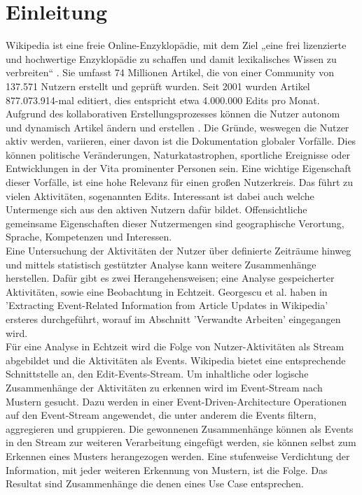 \section{Einleitung}\label{sec:Einleitung}
Wikipedia ist eine freie Online-Enzyklopädie, mit dem Ziel „eine frei lizenzierte und hochwertige Enzyklopädie zu schaffen und damit lexikalisches Wissen zu verbreiten“ \cite{wales.}. Sie umfasst 74 Millionen Artikel, die von einer Community von 137.571 Nutzern erstellt und geprüft wurden. Seit 2001 wurden Artikel 877.073.914-mal editiert, dies entspricht etwa 4.000.000 Edits pro Monat. \cite{wikistat}\\

Aufgrund des kollaborativen Erstellungsprozesses können die Nutzer autonom und dynamisch Artikel ändern und erstellen \cite{wikipedia.}.
Die Gründe, weswegen die Nutzer aktiv werden, variieren, einer davon ist die Dokumentation globaler Vorfälle. Dies können politische Veränderungen, Naturkatastrophen, sportliche Ereignisse oder Entwicklungen in der Vita prominenter Personen sein. Eine wichtige Eigenschaft dieser Vorfälle, ist eine hohe Relevanz für einen großen Nutzerkreis. Das führt zu vielen Aktivitäten, sogenannten Edits. Interessant ist dabei auch welche Untermenge sich aus den aktiven Nutzern dafür bildet. Offensichtliche gemeinsame Eigenschaften dieser Nutzermengen sind geographische Verortung, Sprache, Kompetenzen und Interessen. \cite{10.1007978-3-642-36973-5_22}\\

Eine Untersuchung der Aktivitäten der Nutzer über definierte Zeiträume hinweg und mittels statistisch gestützter Analyse kann weitere Zusammenhänge herstellen. Dafür gibt es zwei Herangehensweisen; eine Analyse gespeicherter Aktivitäten, sowie eine Beobachtung in Echtzeit. Georgescu et al. \cite{10.1007978-3-642-36973-5_22} haben in 'Extracting Event-Related Information from Article Updates in Wikipedia' ersteres durchgeführt, worauf im Abschnitt 'Verwandte Arbeiten' eingegangen wird. \\

Für eine Analyse in Echtzeit wird die Folge von Nutzer-Aktivitäten als Stream abgebildet und die Aktivitäten als Events. Wikipedia bietet eine entsprechende Schnittstelle an, den Edit-Events-Stream. Um inhaltliche oder logische Zusammenhänge der Aktivitäten zu erkennen wird im Event-Stream nach Mustern gesucht. Dazu werden in einer Event-Driven-Architecture Operationen auf den Event-Stream angewendet, die unter anderem die Events filtern, aggregieren und gruppieren. Die gewonnenen Zusammenhänge können als Events in den Stream zur weiteren Verarbeitung eingefügt werden, sie können selbst zum Erkennen eines Musters herangezogen werden. Eine stufenweise Verdichtung der Information, mit jeder weiteren Erkennung von Mustern, ist die Folge. Das Resultat sind Zusammenhänge die denen eines Use Case entsprechen.

